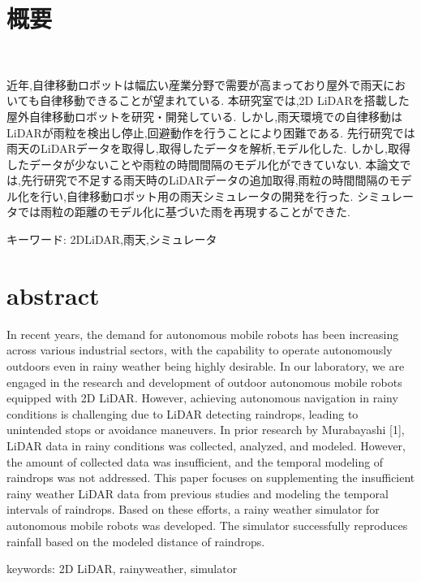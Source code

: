 \chapter*{概要}
\thispagestyle{empty}
%
\begin{center}
  \scalebox{1.5}{自律移動ロボット用の雨天シミュレータの開発}\\
  \scalebox{1.5}{(検出された雨粒の時間間隔のモデル化)}
  \vspace{1.0zh}
\end{center}
\vspace{1.0zh}
%

%
近年,自律移動ロボットは幅広い産業分野で需要が高まっており屋外で雨天においても自律移動できることが望まれている.
本研究室では,2D LiDARを搭載した屋外自律移動ロボットを研究・開発している.
しかし,雨天環境での自律移動はLiDARが雨粒を検出し停止,回避動作を行うことにより困難である.
先行研究\cite{mura}では雨天のLiDARデータを取得し,取得したデータを解析,モデル化した.
しかし,取得したデータが少ないことや雨粒の時間間隔のモデル化ができていない.
本論文では,先行研究で不足する雨天時のLiDARデータの追加取得,雨粒の時間間隔のモデル化を行い,自律移動ロボット用の雨天シミュレータの開発を行った.
シミュレータでは雨粒の距離のモデル化に基づいた雨を再現することができた.
%
%
%
%
%
%
%
%
%
%
%
%
%

\vspace{2.0zh}
キーワード: 2DLiDAR,雨天,シミュレータ
%

\newpage
\chapter*{abstract}
\thispagestyle{empty}
%
\begin{center}
  \scalebox{1.3}{Development of a Rainy Weather Simulator for Autonomous Mobile Robots}
  \scalebox{1.3}{(Modeling the Temporal Intervals of Detected Raindrops)}
\end{center}
\vspace{1.0zh}
%
In recent years, the demand for autonomous mobile robots has been increasing across various industrial sectors, with the capability to operate autonomously outdoors even in rainy weather being highly desirable.  
In our laboratory, we are engaged in the research and development of outdoor autonomous mobile robots equipped with 2D LiDAR.
However, achieving autonomous navigation in rainy conditions is challenging due to LiDAR detecting raindrops, leading to unintended stops or avoidance maneuvers.  
In prior research by Murabayashi [1], LiDAR data in rainy conditions was collected, analyzed, and modeled. 
However, the amount of collected data was insufficient, and the temporal modeling of raindrops was not addressed.  
This paper focuses on supplementing the insufficient rainy weather LiDAR data from previous studies and modeling the temporal intervals of raindrops.
Based on these efforts, a rainy weather simulator for autonomous mobile robots was developed.
The simulator successfully reproduces rainfall based on the modeled distance of raindrops.
%
\vspace{2.0zh}

keywords: 2D LiDAR, rainyweather, simulator